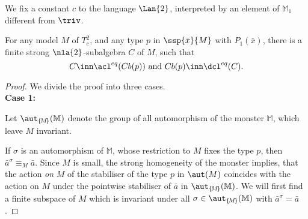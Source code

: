 \begin{teo}\label{teowei}
We fix a constant $c$ to the language $\Lan{2}$, interpreted by an element of $\mathbb{M}_{1}$ different from $\triv$.

For any model $M$ of $T^{2}_{c}$, and any type $p$ in $\ssp{\bar x}{M}$ with $P_{1}(\bar x)$,
there is a finite strong $\nla{2}$-subalgebra $C$ of $M$,
such that
$$C\inn\acl^{eq}(Cb(p))\text{ and }Cb(p)\inn\dcl^{eq}(C).$$
\end{teo}
\begin{proof}
We divide the proof into three cases.\\[+0.7mm]\noindent
{\bf Case 1:}

\medskip
Let $\aut_{\{\!M\!\}}(\mathbb{M})$ denote the group of all automorphism of the monster $\mathbb{M}$,
which leave $M$ invariant.

If $\sigma$ is an automorphism of $\mathbb{M}$, whose restriction to ${M}$ fixes the type $p$,
then $\bar a^{\sigma}\equiv_{M}\bar a$.
%
Since $M$ is small, the strong homogeneity of the monster implies, that
the action {\em on} $M$ of the stabiliser of the type $p$ %
in $\aut(M)$ %
coincides with the action on $M$ %
under the pointwise stabiliser of %
$\bar a$ in $\aut_{\{\!M\!\}}(\mathbb{M})$. %
We will first find a finite subspace of $M$ which is invariant under all $\sigma\in\aut_{\{\!M\!\}}(\mathbb{M})$ with
$\bar a^{\sigma}=\bar a$.


\end{proof}

